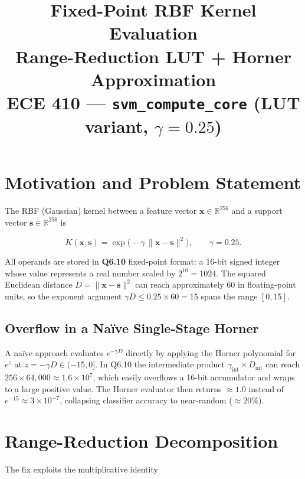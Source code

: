 \documentclass[11pt,a4paper]{article}
\title{\textbf{Fixed-Point RBF Kernel Evaluation}\\
       \large Range-Reduction LUT + Horner Approximation\\
       \normalsize ECE 410 --- \texttt{svm\_compute\_core} (LUT variant, $\gamma = 0.25$)}
\author{}
\date{}
\begin{document}
\maketitle
\tableofcontents
\bigskip

\section{Motivation and Problem Statement}

The RBF (Gaussian) kernel between a feature vector $\mathbf{x}\in\mathbb{R}^{256}$
and a support vector $\mathbf{s}\in\mathbb{R}^{256}$ is

\begin{equation}
  K(\mathbf{x},\mathbf{s}) = \exp\!\bigl(-\gamma\,\|\mathbf{x}-\mathbf{s}\|^2\bigr),
  \qquad \gamma = 0.25.
  \label{eq:rbf}
\end{equation}

All operands are stored in \textbf{Q6.10} fixed-point format: a 16-bit signed
integer whose value represents a real number scaled by $2^{10}=1024$.  The
squared Euclidean distance $D = \|\mathbf{x}-\mathbf{s}\|^2$ can reach
approximately 60 in floating-point units, so the exponent argument
$\gamma D \leq 0.25 \times 60 = 15$ spans the range $[0, 15]$.

\subsection{Overflow in a Na\"{i}ve Single-Stage Horner}

A na\"ive approach evaluates $e^{-\gamma D}$ directly by applying the Horner
polynomial for $e^z$ at $z = -\gamma D \in (-15, 0]$.  In Q6.10 the
intermediate product $\gamma_\text{int} \times D_\text{int}$ can reach
$256 \times 64{,}000 \approx 1.6 \times 10^7$, which easily overflows a
16-bit accumulator and wraps to a large positive value.  The Horner evaluator
then returns $\approx 1.0$ instead of $e^{-15} \approx 3\times 10^{-7}$,
collapsing classifier accuracy to near-random ($\approx 20\%$).

\section{Range-Reduction Decomposition}

The fix exploits the multiplicative identity
\end{document}
